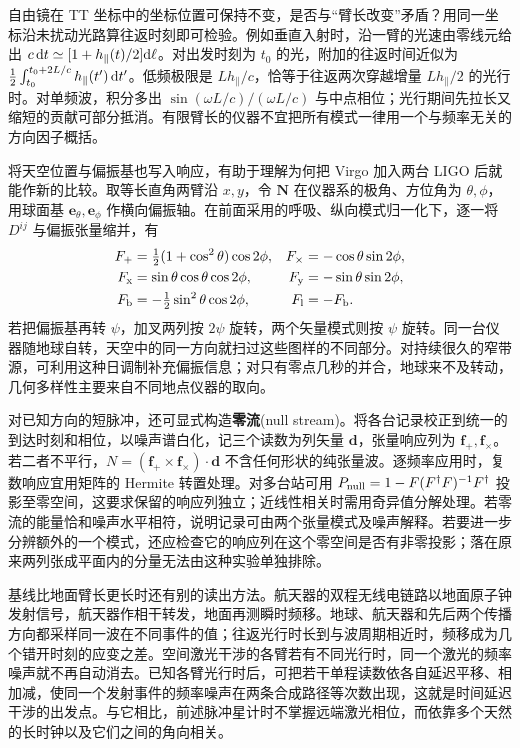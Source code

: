 自由镜在 TT 坐标中的坐标位置可保持不变，是否与“臂长改变”矛盾？用同一坐标沿未扰动光路算往返时刻即可检验。例如垂直入射时，沿一臂的光速由零线元给出 $c\,\dd t\simeq[1+h_\parallel(t)/2]\dd\ell$。对出发时刻为 $t_0$ 的光，附加的往返时间近似为 $\tfrac12\int_{t_0}^{t_0+2L/c}h_\parallel(t')\,\dd t'$。低频极限是 $Lh_\parallel/c$，恰等于往返两次穿越增量 $Lh_\parallel/2$ 的光行时。对单频波，积分多出 $\sin(\omega L/c)/(\omega L/c)$ 与中点相位；光行期间先拉长又缩短的贡献可部分抵消。有限臂长的仪器不宜把所有模式一律用一个与频率无关的方向因子概括。

将天空位置与偏振基也写入响应，有助于理解为何把 Virgo 加入两台 LIGO 后就能作新的比较。取等长直角两臂沿 $x,y$，令 $\bm N$ 在仪器系的极角、方位角为 $\theta,\phi$，用球面基 $\bm e_\theta,\bm e_\phi$ 作横向偏振轴。在前面采用的呼吸、纵向模式归一化下，逐一将 $D^{ij}$ 与偏振张量缩并，有
\begin{align*}
 F_+&=\tfrac12(1+\cos^2\theta)\cos2\phi,&
 F_\times&=-\cos\theta\sin2\phi,\\
 F_{\rm x}&=\sin\theta\cos\theta\cos2\phi,&
 F_{\rm y}&=-\sin\theta\sin2\phi,\\
 F_{\rm b}&=-\tfrac12\sin^2\theta\cos2\phi,&
 F_{\rm l}&=-F_{\rm b}.
\end{align*}
若把偏振基再转 $\psi$，加叉两列按 $2\psi$ 旋转，两个矢量模式则按 $\psi$ 旋转。同一台仪器随地球自转，天空中的同一方向就扫过这些图样的不同部分。对持续很久的窄带源，可利用这种日调制补充偏振信息；对只有零点几秒的并合，地球来不及转动，几何多样性主要来自不同地点仪器的取向。

对已知方向的短脉冲，还可显式构造\textbf{零流}(null stream)。将各台记录校正到统一的到达时刻和相位，以噪声谱白化，记三个读数为列矢量 $\bm d$，张量响应列为 $\bm f_+,\bm f_\times$。若二者不平行，$N=(\bm f_+\times\bm f_\times)\cdot\bm d$ 不含任何形状的纯张量波。逐频率应用时，复数响应宜用矩阵的 Hermite 转置处理。对多台站可用 $P_{\rm null}=1-F(F^\dagger F)^{-1}F^\dagger$ 投影至零空间，这要求保留的响应列独立；近线性相关时需用奇异值分解处理。若零流的能量恰和噪声水平相符，说明记录可由两个张量模式及噪声解释。若要进一步分辨额外的一个模式，还应检查它的响应列在这个零空间是否有非零投影；落在原来两列张成平面内的分量无法由这种实验单独排除。

基线比地面臂长更长时还有别的读出方法。航天器的双程无线电链路以地面原子钟发射信号，航天器作相干转发，地面再测瞬时频移。地球、航天器和先后两个传播方向都采样同一波在不同事件的值；往返光行时长到与波周期相近时，频移成为几个错开时刻的应变之差。空间激光干涉的各臂若有不同光行时，同一个激光的频率噪声就不再自动消去。已知各臂光行时后，可把若干单程读数依各自延迟平移、相加减，使同一个发射事件的频率噪声在两条合成路径等次数出现，这就是时间延迟干涉的出发点。与它相比，前述脉冲星计时不掌握远端激光相位，而依靠多个天然的长时钟以及它们之间的角向相关。

